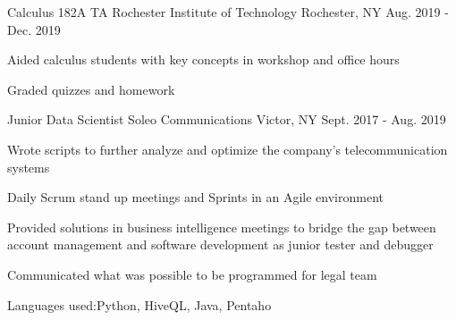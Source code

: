 \begin{cventries}
{\begin{cvitems}
      \end{cvitems}
    }
    \cventry
    {Calculus 182A TA}
    {Rochester Institute of Technology}
    {Rochester, NY}
    {Aug. 2019 - Dec. 2019}
    {
      \begin{cvitems}
        \item {Aided calculus students with key concepts in workshop and office hours}
        \item {Graded quizzes and homework}
      \end{cvitems}
    }
  \cventry
    {Junior Data Scientist}
    {Soleo Communications}
    {Victor, NY}
    {Sept. 2017 - Aug. 2019}
    {
      \begin{cvitems}
        \item {Wrote scripts to further analyze and optimize the company's telecommunication systems}
        \item {Daily Scrum stand up meetings and Sprints in an Agile environment}
        \item {Provided solutions in business intelligence meetings to bridge the gap between account management and software development as junior tester and debugger}
        \item{Communicated what was possible to be programmed for legal team}
        \item{Languages used:Python, HiveQL, Java, Pentaho}
      \end{cvitems}
    }


\end{cventries}
